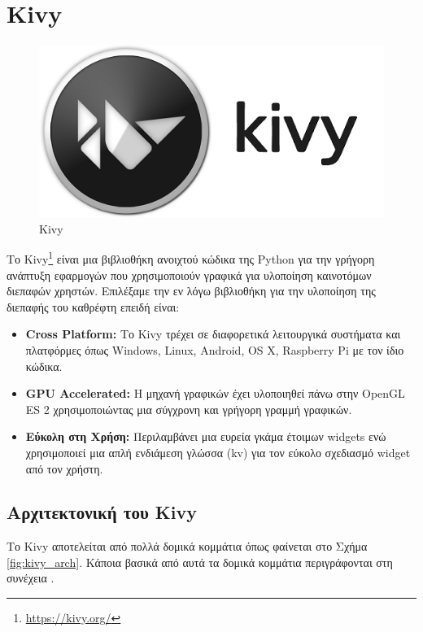 \section{Kivy}
\label{sec:kivy}

\begin{figure}[h]
    \centering
    \includegraphics[scale=0.5]{images/chapter3/kivy_logo.png}
    \caption{Kivy}
\end{figure}

Το Kivy\footnote{\href{https://kivy.org/}{https://kivy.org/}} είναι μια βιβλιοθήκη ανοιχτού κώδικα της Python για την γρήγορη ανάπτυξη εφαρμογών που χρησιμοποιούν γραφικά για υλοποίηση καινοτόμων διεπαφών χρηστών. Επιλέξαμε την εν λόγω βιβλιοθήκη για την υλοποίηση της διεπαφής του καθρέφτη επειδή είναι:
\begin{itemize}
    \item \textbf{Cross Platform:} Το Kivy τρέχει σε διαφορετικά λειτουργικά συστήματα και πλατφόρμες όπως Windows, Linux, Android, OS X, Raspberry Pi με τον ίδιο κώδικα.
    \item \textbf{GPU Accelerated:} Η μηχανή γραφικών έχει υλοποιηθεί πάνω στην OpenGL ES 2 χρησιμοποιώντας μια σύγχρονη και γρήγορη γραμμή γραφικών.
    \item \textbf{Εύκολη στη Χρήση:} Περιλαμβάνει μια ευρεία γκάμα έτοιμων widgets ενώ χρησιμοποιεί μια απλή ενδιάμεση γλώσσα (kv) για τον εύκολο σχεδιασμό widget από τον χρήστη.
\end{itemize}

\subsection{Αρχιτεκτονική του Kivy}
Το Kivy αποτελείται από πολλά δομικά κομμάτια όπως φαίνεται στο Σχήμα \ref{fig:kivy_arch}. Κάποια βασικά από αυτά τα δομικά κομμάτια περιγράφονται στη συνέχεια \cite{kivy}.

